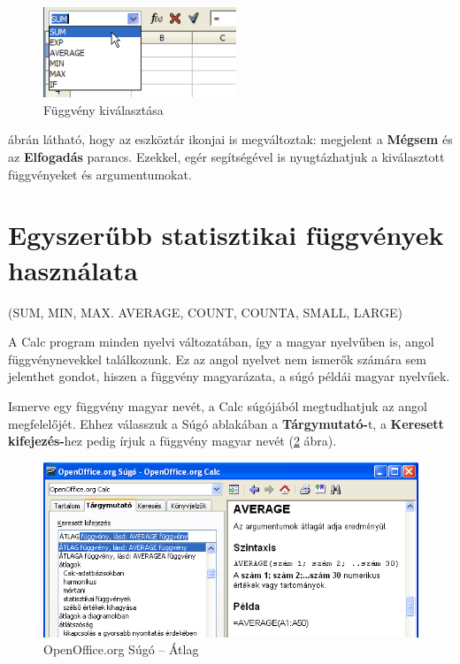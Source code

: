 \begin{figure}[h]
\begin{center}
\includegraphics[width=5.772cm]{oocalcv1-img33.png}
\caption{Függvény kiválasztása}\label{FüggvényKiválasztás}
\end{center}
\end{figure}

 ábrán látható, hogy az eszköztár ikonjai is
megváltoztak: megjelent a \textbf{Mégsem} és az
\textbf{Elfogadás} parancs. Ezekkel, egér segítségével is
nyugtázhatjuk a kiválasztott függvényeket és argumentumokat.

\section{Egyszerűbb statisztikai függvények használata}
(SUM, MIN, MAX. AVERAGE, COUNT, COUNTA, SMALL, LARGE)

A Calc program minden nyelvi változatában, így a magyar
nyelvűben is, angol függvénynevekkel találkozunk. Ez az angol
nyelvet nem ismerők számára sem jelenthet gondot, hiszen a
függvény magyarázata, a súgó példái magyar nyelvűek. 

Ismerve egy függvény magyar nevét, a Calc súgójából
megtudhatjuk az angol megfelelőjét. Ehhez válasszuk a Súgó
ablakában a \textbf{Tárgymutató-}t, a \textbf{Keresett
kifejezés-}hez pedig írjuk a függvény magyar nevét
(\ref{SúgóÁtlag} ábra).


\begin{figure}[!h]
\begin{center}
\includegraphics[width=13.193cm]{oocalcv1-img34.png}
\caption{OpenOffice.org Súgó --  Átlag}\label{SúgóÁtlag}
\end{center}
\end{figure}

